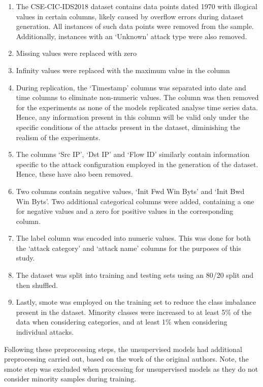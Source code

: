 \begin{enumerate}
      \item The CSE-CIC-IDS2018 dataset contains data points dated 1970 with illogical
            values in certain columns, likely caused by overflow errors during dataset
            generation. All instances of such data points were removed from the sample.
            Additionally, instances with an `Unknown' attack type were also removed.
      \item Missing values were replaced with zero
      \item Infinity values were replaced with the maximum value in the column
      \item During replication, the `Timestamp' columns was separated into date and time
            columns to eliminate non-numeric values. The column was then removed for the
            experiments as none of the models replicated analyse time series data. Hence,
            any information present in this column will be valid only under the specific
            conditions of the attacks present in the dataset, diminishing the realism of
            the experiments.
      \item The columns `Src IP', `Dst IP' and `Flow ID' similarly contain information
            specific to the attack configuration employed in the generation of the dataset.
            Hence, these have also been removed.
      \item Two columns contain negative values, `Init Fwd Win Byts' and `Init Bwd Win
            Byts'. Two additional categorical columns were added, containing a one for
            negative values and a zero for positive values in the corresponding column.
      \item The label column was encoded into numeric values. This was done for both the
            `attack category' and `attack name' columns for the purposes of this study.
      \item The dataset was split into training and testing sets using an 80/20 split and
            then shuffled.
      \item Lastly, \gls{smote} was employed on the training set to reduce the class
            imbalance present in the dataset. Minority classes were increased to at least
            5\% of the data when considering categories, and at least 1\% when considering
            individual attacks.
\end{enumerate}

Following these preprocessing steps, the unsupervised models had additional
preprocessing carried out, based on the work of the original authors. Note, the
\gls{smote} step was excluded when processing for unsupervised models as they
do not consider minority samples during training.

